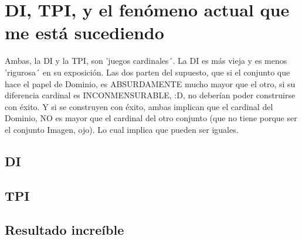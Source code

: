 \chapter{DI, TPI, y el fenómeno actual que me está sucediendo}

	Ambas, la DI y la TPI, son 'juegos cardinales´. La DI es más vieja y es menos 'rigurosa´ en su exposición. Las dos parten del supuesto, que si el conjunto que hace el papel de Dominio, es ABSURDAMENTE mucho mayor que el otro, si su diferencia cardinal es INCONMENSURABLE, :D, no deberían poder construirse con éxito. Y si se construyen con éxito, ambas implican que el cardinal del Dominio, NO es mayor que el cardinal del otro conjunto (que no tiene porque ser el conjunto Imagen, ojo). Lo cual implica que pueden ser iguales.

	\section{DI}
		
	
	
	
	\section{TPI}
	
	
	
	\section{Resultado increíble}